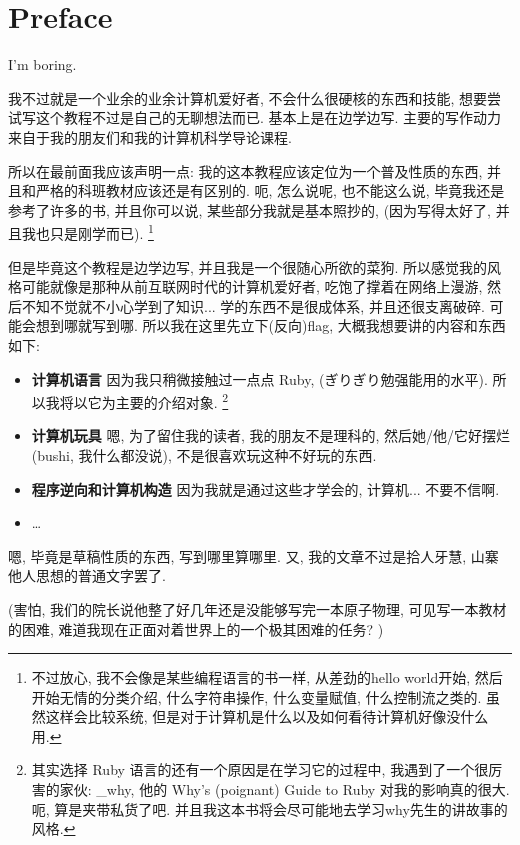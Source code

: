 \chapter{Preface}

\centerline{I'm boring. }

我不过就是一个业余的业余计算机爱好者, 不会什么很硬核的东西和技能, 想要尝试写这个教程不过是自己的无聊想法而已. 基本上是在边学边写. 主要的写作动力来自于我的朋友们和我的计算机科学导论课程. 

所以在最前面我应该声明一点: 我的这本教程应该定位为一个普及性质的东西, 并且和严格的科班教材应该还是有区别的. 呃, 怎么说呢, 也不能这么说, 
毕竟我还是参考了许多的书, 并且你可以说, 某些部分我就是基本照抄的, (因为写得太好了, 并且我也只是刚学而已). \footnote{不过放心, 我不会像是某些编程语言的书一样, 从差劲的hello world开始, 然后开始无情的分类介绍, 什么字符串操作, 什么变量赋值, 什么控制流之类的. 虽然这样会比较系统, 但是对于计算机是什么以及如何看待计算机好像没什么用. }

但是毕竟这个教程是边学边写, 并且我是一个很随心所欲的菜狗. 所以感觉我的风格可能就像是那种从前互联网时代的计算机爱好者, 吃饱了撑着在网络上漫游, 然后不知不觉就不小心学到了知识... 学的东西不是很成体系, 并且还很支离破碎. 可能会想到哪就写到哪. 所以我在这里先立下(反向)flag, 大概我想要讲的内容和东西如下: 

\begin{itemize}
  \item \textbf{计算机语言} 因为我只稍微接触过一点点 Ruby, 
  (ぎりぎり勉强能用的水平). 所以我将以它为主要的介绍对象. 
  \footnote{其实选择 Ruby 语言的还有一个原因是在学习它的过程中, 我遇到了一个很厉害的家伙: \_why, 他的 Why's (poignant) Guide to Ruby 对我的影响真的很大. 呃, 算是夹带私货了吧. 并且我这本书将会尽可能地去学习why先生的讲故事的风格. }
  \item \textbf{计算机玩具} 嗯, 为了留住我的读者, 
  我的朋友不是理科的, 然后她/他/它好摆烂(bushi, 我什么都没说), 
  不是很喜欢玩这种不好玩的东西. 
  \item \textbf{程序逆向和计算机构造} 因为我就是通过这些才学会的,
  计算机... 不要不信啊. 
  \item \dots
\end{itemize}

嗯, 毕竟是草稿性质的东西, 写到哪里算哪里. 又, 我的文章不过是拾人牙慧, 山寨他人思想的普通文字罢了. 

(害怕, 我们的院长说他整了好几年还是没能够写完一本原子物理, 可见写一本教材的困难, 难道我现在正面对着世界上的一个极其困难的任务? )

% 
% 
% 
% 
